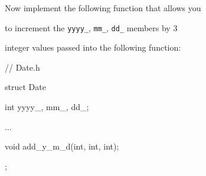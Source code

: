 Now implement the following function that allows you

to increment the \texttt{yyyy\_}, \texttt{mm\_}, \texttt{dd\_} members by 3

integer values passed into the following function:



\begin{consolethree}[escapeinside=||]

// Date.h

struct Date

{

    int yyyy_, mm_, dd_;

    ...

    void add_y_m_d(int, int, int);

};

\end{consolethree}

